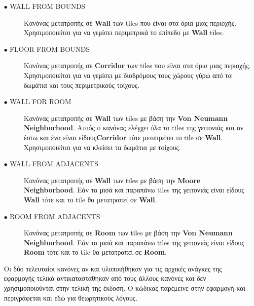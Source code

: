 \begin{description}
\item[$\bullet$ WALL FROM BOUNDS] Κανόνας μετατροπής σε \textbf{Wall} των tiles που είναι στα όρια μιας περιοχής. Χρησιμοποιείται για να γεμίσει περιμετρικά το επίπεδο με \textbf{Wall} tiles.
\item[$\bullet$ FLOOR FROM BOUNDS] Κανόνας μετατροπής σε \textbf{Corridor} των tiles που είναι στα όρια μιας περιοχής. Χρησιμοποιείται για να γεμίσει με διαδρόμους τους χώρους γύρω από τα δωμάτια και τους περιμετρικούς τοίχους.
\item[$\bullet$ WALL FOR ROOM] Κανόνας μετατροπής σε \textbf{Wall} των tiles με βάση την \textbf{Von Neumann Neighborhood}. Αυτός ο κανόνας ελέγχει όλα τα tiles της γειτονιάς και αν έστω και ένα είναι είδους\textbf{Corridor} τότε μετατρέπει το tile σε \textbf{Wall}. Χρησιμοποιείται για να κλείσει τα δωμάτια με τοίχους.
\item[$\bullet$ WALL FROM ADJACENTS] Κανόνας μετατροπής σε \textbf{Wall} των tiles με βάση την \textbf{Moore Neighborhood}. Εάν τα μισά και παραπάνω tiles της γειτονιάς είναι είδους \textbf{Wall} τότε και το tile θα μετατραπεί σε \textbf{Wall}.
\item[$\bullet$ ROOM FROM ADJACENTS] Κανόνας μετατροπής σε \textbf{Room} των tiles με βάση την \textbf{Von Neumann Neighborhood}. Εάν τα μισά και παραπάνω tiles της γειτονιάς είναι είδους \textbf{Room} τότε και το tile θα μετατραπεί σε \textbf{Room}.
\end{description}

\par
Οι δύο τελευταίοι κανόνες αν και υλοποιήθηκαν για τις αρχικές ανάγκες της εφαρμογής τελικά αντικαταστάθηκαν από τους άλλους κανόνες και δεν χρησιμοποιούνται στην τελική της έκδοση. O κώδικας παρέμεινε στην εφαρμογή και περιγράφεται και εδώ για θεωρητικούς λόγους.

